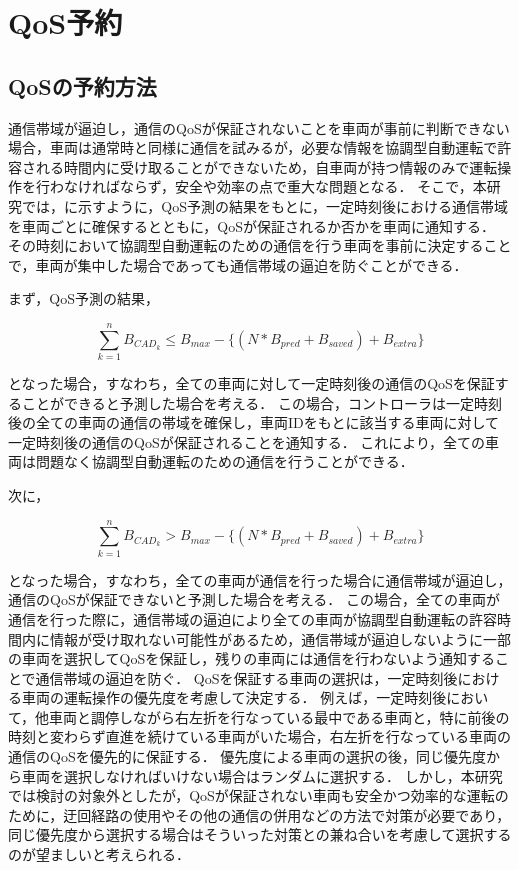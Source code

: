 \documentclass[a4paper,11pt,uplatex]{ujreport}
\begin{document}
\section{QoS予約}
\label{sec:QoS予約}

\subsection{QoSの予約方法}

通信帯域が逼迫し，通信のQoSが保証されないことを車両が事前に判断できない場合，車両は通常時と同様に通信を試みるが，必要な情報を協調型自動運転で許容される時間内に受け取ることができないため，自車両が持つ情報のみで運転操作を行わなければならず，安全や効率の点で重大な問題となる．
そこで，本研究では，に示すように，QoS予測の結果をもとに，一定時刻後における通信帯域を車両ごとに確保するとともに，QoSが保証されるか否かを車両に通知する．
その時刻において協調型自動運転のための通信を行う車両を事前に決定することで，車両が集中した場合であっても通信帯域の逼迫を防ぐことができる．\par
まず，QoS予測の結果，

\begin{equation}
\sum_{k=1}^{n} B_{CAD_k} \leq B_{max} - \{(N * B_{pred} + B_{saved}) + B_{extra}\}
\end{equation}

となった場合，すなわち，全ての車両に対して一定時刻後の通信のQoSを保証することができると予測した場合を考える．
この場合，コントローラは一定時刻後の全ての車両の通信の帯域を確保し，車両IDをもとに該当する車両に対して一定時刻後の通信のQoSが保証されることを通知する．
これにより，全ての車両は問題なく協調型自動運転のための通信を行うことができる．\par
次に，

\begin{equation}
\sum_{k=1}^{n} B_{CAD_k} > B_{max} - \{(N * B_{pred} + B_{saved}) + B_{extra}\}
\end{equation}

となった場合，すなわち，全ての車両が通信を行った場合に通信帯域が逼迫し，通信のQoSが保証できないと予測した場合を考える．
この場合，全ての車両が通信を行った際に，通信帯域の逼迫により全ての車両が協調型自動運転の許容時間内に情報が受け取れない可能性があるため，通信帯域が逼迫しないように一部の車両を選択してQoSを保証し，残りの車両には通信を行わないよう通知することで通信帯域の逼迫を防ぐ．
QoSを保証する車両の選択は，一定時刻後における車両の運転操作の優先度を考慮して決定する．
例えば，一定時刻後において，他車両と調停しながら右左折を行なっている最中である車両と，特に前後の時刻と変わらず直進を続けている車両がいた場合，右左折を行なっている車両の通信のQoSを優先的に保証する．
優先度による車両の選択の後，同じ優先度から車両を選択しなければいけない場合はランダムに選択する．
しかし，本研究では検討の対象外としたが，QoSが保証されない車両も安全かつ効率的な運転のために，迂回経路の使用やその他の通信の併用などの方法で対策が必要であり，同じ優先度から選択する場合はそういった対策との兼ね合いを考慮して選択するのが望ましいと考えられる．
\end{document}
